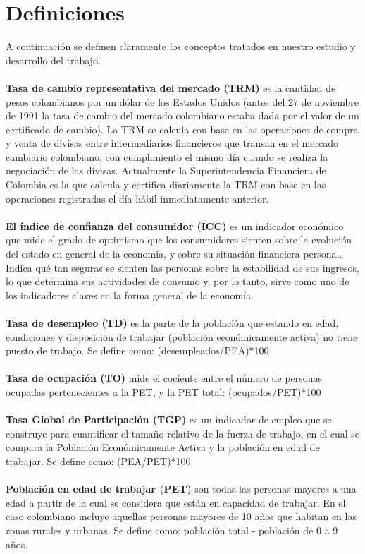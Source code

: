 \documentclass[11pt,twoside]{article}
\begin{document}
\section{Definiciones}
\noindent A continuación se definen claramente los conceptos tratados en nuestro estudio y desarrollo del trabajo.
\\
\\
\textbf{Tasa de cambio representativa del mercado (TRM)} es la cantidad de pesos colombianos por un dólar de los Estados Unidos (antes del 27 de noviembre de 1991 la tasa de cambio del mercado colombiano estaba dada por el valor de un certificado de cambio). La TRM se calcula con base en las operaciones de compra y venta de divisas entre intermediarios financieros que transan en el mercado cambiario colombiano, con cumplimiento el mismo día cuando se realiza la negociación de las divisas. Actualmente la Superintendencia Financiera de Colombia es la que calcula y certifica diariamente la TRM con base en las operaciones  registradas el día hábil inmediatamente anterior.
\\
\\
\textbf{El índice de confianza  del consumidor (ICC)} es un indicador económico que mide el grado de optimismo que los consumidores sienten sobre la evolución del estado en general de la economía, y sobre su situación financiera personal. Indica qué tan seguras se sienten las personas sobre la estabilidad de sus ingresos, lo que determina sus actividades de consumo y, por lo tanto, sirve como uno de los indicadores claves en la forma general de la economía.
\\
\\
\textbf{Tasa de desempleo (TD)} es la parte de la población que estando en edad, condiciones y disposición de trabajar (población económicamente activa) no tiene puesto de trabajo. Se define como: (desempleados/PEA)*100
\\
\\
\textbf{Tasa de ocupación (TO)} mide el cociente entre el número de personas ocupadas pertenecientes a la PET, y la PET total: (ocupados/PET)*100
\\
\\
\textbf{Tasa Global de Participación (TGP)} es un indicador de empleo que se construye para cuantificar el tamaño relativo de la fuerza de trabajo, en el cual se compara la Población Económicamente Activa y la población en edad de trabajar. Se define como: (PEA/PET)*100
\\
\\
\textbf{Población en edad de trabajar (PET)} son todas las personas mayores a una edad  a partir de la cual se considera que están en capacidad de trabajar. En el caso colombiano incluye aquellas personas mayores de 10 años que habitan en las zonas rurales y urbanas. Se define como: población total - población de 0 a 9 años.
\end{document}
